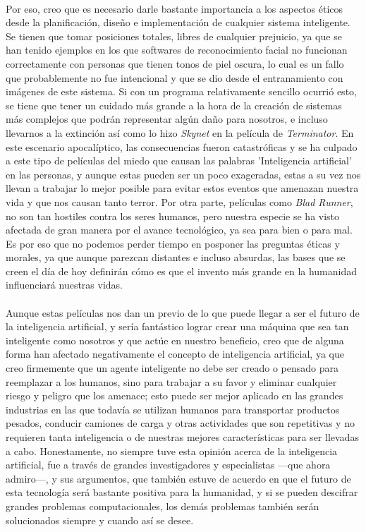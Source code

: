 \documentclass{scrreprt}
\begin{document}
\paragraph{}Por eso, creo que es necesario darle bastante importancia a los aspectos éticos desde la planificación, diseño e implementación de cualquier sistema inteligente. Se tienen que tomar posiciones totales, libres de cualquier prejuicio, ya que se han tenido ejemplos en los que softwares de reconocimiento facial no funcionan correctamente con personas que tienen tonos de piel oscura, lo cual es un fallo que probablemente no fue intencional y que se dio desde el entranamiento con imágenes de este sistema. Si con un programa relativamente sencillo ocurrió esto, se tiene que tener un cuidado más grande a la hora de la creación de sistemas más complejos que podrán representar algún daño para nosotros, e incluso llevarnos a la extinción así como lo hizo \emph{Skynet} en la película de \emph{Terminator}. En este escenario apocalíptico, las consecuencias fueron catastróficas y se ha culpado a este tipo de películas del miedo que causan las palabras 'Inteligencia artificial' en las personas, y aunque estas pueden ser un poco exageradas, estas a su vez nos llevan a trabajar lo mejor posible para evitar estos eventos que amenazan nuestra vida y que nos causan tanto terror. Por otra parte, películas como \emph{Blad Runner}, no son tan hostiles contra los seres humanos, pero nuestra especie se ha visto afectada de gran manera por el avance tecnológico, ya sea para bien o para mal. Es por eso que no podemos perder tiempo en posponer las preguntas éticas y morales, ya que aunque parezcan distantes e incluso absurdas, las bases que se creen el día de hoy definirán cómo es que el invento más grande en la humanidad influenciará nuestras vidas.

\paragraph{}Aunque estas películas nos dan un previo de lo que puede llegar a ser el futuro de la inteligencia artificial, y sería fantástico lograr crear una máquina que sea tan inteligente como nosotros y que actúe en nuestro beneficio, creo que de alguna forma han afectado negativamente el concepto de inteligencia artificial, ya que creo firmemente que un agente inteligente no debe ser creado o pensado para reemplazar a los humanos, sino para trabajar a su favor y eliminar cualquier riesgo y peligro que los amenace; esto puede ser mejor aplicado en las grandes industrias en las que todavía se utilizan humanos para transportar productos pesados, conducir camiones de carga y otras actividades que son repetitivas y no requieren tanta inteligencia o de nuestras mejores características para ser llevadas a cabo. Honestamente, no siempre tuve esta opinión acerca de la inteligencia artificial, fue a través de grandes investigadores y especialistas —que ahora admiro—, y sus argumentos, que también estuve de acuerdo en que el futuro de esta tecnología será bastante positiva para la humanidad, y si se pueden descifrar grandes problemas computacionales, los demás problemas también serán solucionados siempre y cuando así se desee.
\end{document}
